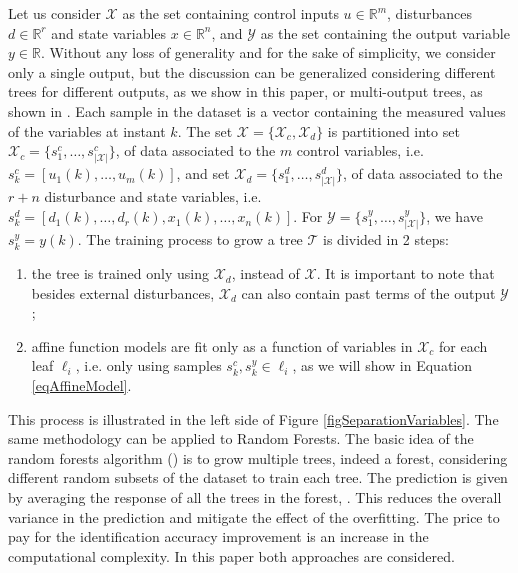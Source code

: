 \documentclass[]{ifacconf}  %
\begin{document}
Let us consider $\mathcal{X}$ as the set containing control inputs $u\in\mathbb{R}^m$, disturbances $d\in\mathbb{R}^r$ and state variables $x\in\mathbb{R}^n$, and $\mathcal{Y}$ as the set containing the output variable $y\in\mathbb{R}$. Without any loss of generality and for the sake of simplicity, we consider only a single output, but the discussion can be generalized considering different trees for different outputs, as we show in this paper, or multi-output trees, as shown in \cite{JainTCPS2017}.
Each sample in the dataset is a vector containing the measured values of the variables at instant $k$.
The set $\mathcal{X}=\{\mathcal{X}_c,\mathcal{X}_d\}$ is partitioned into set $\mathcal{X}_c = \{s_1^c,\ldots,s_{|\mathcal{X}|}^c\}$, of data associated to the $m$ control variables, i.e. $s_k^c = [u_1(k),\ldots,u_m(k)]$, and set $\mathcal{X}_d = \{s_1^d,\ldots,s_{|\mathcal{X}|}^d\}$, of data associated to the $r+n$ disturbance and state variables, i.e. $s_k^d = [d_1(k),\ldots,d_r(k),x_1(k),\ldots,x_n(k)]$.
For $\mathcal{Y} = \{s_1^y,\ldots,s_{|\mathcal{X}|}^y\}$, we have $s_k^y = y(k)$.
The training process to grow a tree $\mathcal{T}$ is divided in 2 steps:
\begin{enumerate}
\item the tree is trained only using $\mathcal{X}_d$, instead of $\mathcal{X}$. 
It is important to note that besides external disturbances, $\mathcal{X}_d$ can also contain past terms of the output $\mathcal{Y}$;
\item affine function models are fit only as a function of variables in $\mathcal{X}_c$ for each leaf $\ell_i$, i.e. only using samples $s_k^c,s_k^y\in\ell_i$, as we will show in Equation \eqref{eqAffineModel}.
\end{enumerate}
This process is illustrated in the left side of Figure \ref{figSeparationVariables}. 
The same methodology can be applied to Random Forests.
The basic idea of the random forests algorithm (\cite{Breiman2001}) is to grow multiple trees, indeed a forest, considering different random subsets of the dataset to train each tree.
The prediction is given by averaging the response of all the trees in the forest, \cite{Breiman2001}.
This reduces the overall variance in the prediction and mitigate the effect of the overfitting.
The price to pay for the identification accuracy improvement is an increase in the computational complexity.
In this paper both approaches are considered.
\end{document}
